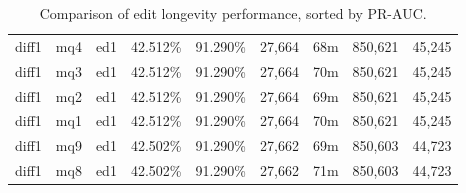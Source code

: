 \begin{sidewaystable}[!ph]
\begin{center}
\begin{tabular}{|c|c|c||c|c||c|c|c|c|}
diff1 & mq4 & ed1 & 42.512\% & 91.290\% & 27,664 & 68m & 850,621 & 45,245 \\
diff1 & mq3 & ed1 & 42.512\% & 91.290\% & 27,664 & 70m & 850,621 & 45,245 \\
diff1 & mq2 & ed1 & 42.512\% & 91.290\% & 27,664 & 69m & 850,621 & 45,245 \\
diff1 & mq1 & ed1 & 42.512\% & 91.290\% & 27,664 & 70m & 850,621 & 45,245 \\
diff1 & mq9 & ed1 & 42.502\% & 91.290\% & 27,662 & 69m & 850,603 & 44,723 \\
diff1 & mq8 & ed1 & 42.502\% & 91.290\% & 27,662 & 71m & 850,603 & 44,723 \\
\hline
\end{tabular}
\end{center}
\caption{Comparison of edit longevity performance,
    sorted by PR-AUC.}
\label{tab:editshoutE}
\end{sidewaystable}
\clearpage
